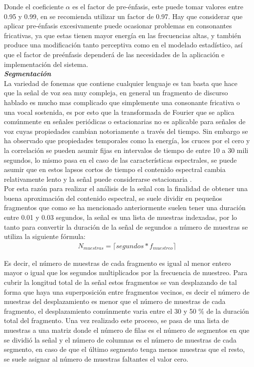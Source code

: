 Donde el coeficiente $\alpha$ es el factor de pre-\'enfasis, este puede tomar valores entre 0.95 y 0.99, en \cite{feng} se recomienda utilizar un factor de 0.97. Hay que considerar que aplicar pre-\'enfasis excesivamente puede ocasionar problemas en consonantes fricativas, ya que estas tienen mayor energ\'ia en las frecuencias altas, y tambi\'en produce una modificaci\'on tanto perceptiva como en el modelado estad\'istico, as\'i que el factor de pre\'enfasis depender\'a de las necesidades de la aplicaci\'on e implementaci\'on del sistema.\\

\noindent
\textbf{\textit{Segmentaci\'on}}\\
\indent
La variedad de fonemas que contiene cualquier lenguaje es tan basta que hace que la señal de voz sea muy compleja, en general un fragmento de discurso hablado es mucho mas complicado que simplemente una consonante fricativa o una vocal sostenida, es por esto que la transformada de Fourier que se aplica com\'unmente en señales peri\'odicas o estacionarias no es aplicable para señales de voz cuyas propiedades cambian notoriamente a trav\'es del tiempo. Sin embargo se ha observado que propiedades temporales como la energ\'ia, los cruces por el cero y la correlaci\'on se pueden asumir fijas en intervalos de tiempo de entre 10 a 30 mili segundos, lo mismo pasa en el caso de las caracter\'isticas espectrales, se puede asumir que en estos lapsos cortos de tiempo el contenido espectral cambia relativamente lento y la señal puede considerarse estacionaria \cite{rabiner1987}.\\

Por esta raz\'on para realizar el an\'alisis de la señal con la finalidad de obtener una buena aproximaci\'on del contenido espectral, se suele dividir en pequeños fragmentos que como se ha mencionado anteriormente suelen tener una duraci\'on entre 0.01 y 0.03 segundos, la señal es una lista de muestras indexadas, por lo tanto para convertir la duraci\'on de la señal de segundos a n\'umero de muestras se utiliza la siguiente f\'ormula:
\begin{align}
   N_{muestras} = \lceil segundos*f_{muestreo} \rceil
\end{align}

Es decir, el n\'umero de muestras de cada fragmento es igual al menor entero mayor o igual que los segundos multiplicados por la frecuencia de muestreo. Para cubrir la longitud total de la señal estos fragmentos se van desplazando de tal forma que haya una superposici\'on entre fragmentos vecinos, es decir el n\'umero de muestras del desplazamiento es menor que el n\'umero de muestras de cada fragmento, el desplazamiento com\'unmente varia entre el 30 y 50 \% de la duraci\'on total del fragmento. Una vez realizado este proceso, se pasa de una lista de muestras a una matriz donde el n\'umero de filas es el n\'umero de segmentos en que se dividi\'o la señal y el n\'umero de columnas es el n\'umero de muestras de cada segmento, en caso de que el \'ultimo segmento tenga menos muestras que el resto, se suele asignar al n\'umero de muestras faltantes el valor cero.\\


